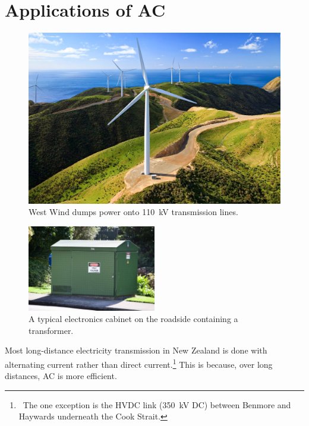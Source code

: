 \documentclass[a4paper]{amsbook}
\theoremstyle{definition}
\numberwithin{exercise}{chapter}
\numberwithin{exercise}{chapter}
\begin{document}
\section{Applications of AC}
\begin{figure}
  \centering
  \includegraphics[width=\textwidth]{westwind}
  \caption{West Wind dumps power onto \SI{110}{\kilo\volt} transmission lines.}\label{fig:resonance}
\end{figure}
\begin{figure}
  \centering
  \includegraphics[width=0.5\textwidth]{transformer2}
  \caption{A typical electronics cabinet on the roadside containing a transformer.}\label{fig:transformer2}
\end{figure}
Most long-distance electricity transmission in New Zealand is done with alternating current rather than direct current.\footnote{~The one
exception is the HVDC link (\SI{350}{\kilo\volt} DC) between Benmore and Haywards underneath the Cook Strait.} This is because, over long
distances, AC is more efficient.
\end{document}
